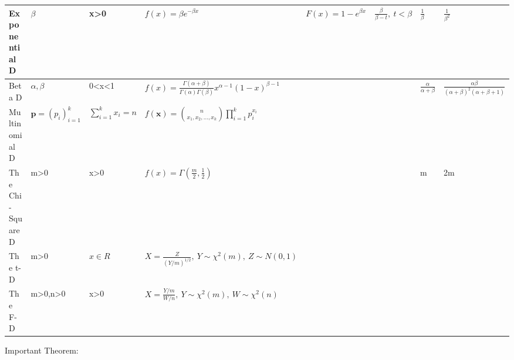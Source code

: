 \documentclass[landscape,12pt,a3paper]{article}
\begin{document}
\begin{table}[H]
\begin{tabular}[7]{|l|l|l|l|l|l|l|l|}
    Exponential D & $\displaystyle \beta$ & x>0 & $\displaystyle f(x)=\beta e^{-\beta x}$ & $\displaystyle F(x)=1-e^{\beta x}$ & $\displaystyle \frac{\beta}{\beta-t},~t<\beta$ & $\displaystyle \frac{1}{\beta}$ & $\displaystyle \frac{1}{\beta^2}$ \\ \hline
    Beta D & $\displaystyle \alpha,\beta$ & 0<x<1 & $\displaystyle f(x)=\frac{\Gamma(\alpha+\beta)}{\Gamma(\alpha)\Gamma(\beta)}x^{\alpha-1}(1-x)^{\beta-1}$ &  &  & $\displaystyle \frac{\alpha}{\alpha+\beta}$ & $\displaystyle \frac{\alpha\beta}{(\alpha+\beta)^2(\alpha+\beta+1)}$ \\ \hline
    Multinomial D & $\displaystyle \mathbf{p}=(p_i)_{i=1}^k$ & $\displaystyle \sum_{i=1}^kx_i=n$ & $\displaystyle f(\mathbf{x})=\binom{n}{x_1,x_2,\dots,x_k}\prod_{i=1}^kp_i^{x_i}$ &  &  &  & \\ \hline
    The Chi-Square D & m>0 & x>0 & $\displaystyle f(x)=\Gamma\left(\frac{m}{2},\frac{1}{2}\right)$ &  &  & m & 2m \\ \hline
    The t-D & m>0 & $\displaystyle x\in R$ & $\displaystyle X=\frac{Z}{(Y/m)^{1/2}},~Y\sim \chi^2(m),~Z\sim N(0,1)$ &  &  &  & \\ \hline
    The F-D & m>0,n>0 & x>0 & $\displaystyle X=\frac{Y/m}{W/n},~Y\sim\chi^2(m),~W\sim\chi^2(n)$ &  &  &  & \\ \hline
    \end{tabular}
\end{table}
Important Theorem:\\\indent
\end{document}

